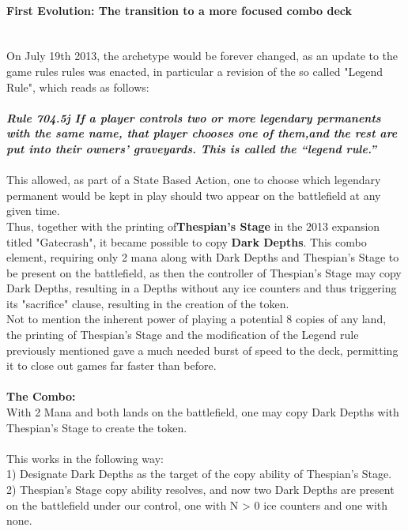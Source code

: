 \documentclass{report}
\begin{document}
\paragraph{First Evolution: The transition to a more focused combo deck\\\\}
On July 19th 2013, the archetype would be forever changed, as an update to the game rules rules was enacted, in particular a revision of the so called "Legend Rule", which reads as follows:\\\\
\textbf {\emph{Rule 704.5j If a player controls two or more legendary permanents with the same name, that player chooses one of them,and the rest are put into their owners’ graveyards. This is called the “legend rule.”\\\\}}
This allowed, as part of a State Based Action, one to choose which legendary permanent would be kept in play should two appear on the battlefield at any given time. \\Thus, together with the printing of\textbf{Thespian's Stage} in the 2013 expansion titled "Gatecrash", it became possible to copy \textbf{Dark Depths}. This combo element, requiring only 2 mana along with Dark Depths and Thespian's Stage to be present on the battlefield, as then the controller of Thespian's Stage may copy Dark Depths, resulting in a Depths without any ice counters and thus triggering its "sacrifice" clause, resulting in the creation of the token.\\
Not to mention the inherent power of playing a potential 8 copies of any land, the printing of Thespian's Stage and the modification of the Legend rule previously mentioned gave a much needed burst of speed to the deck, permitting it to close out games far faster than before.\\\\
\textbf{The Combo:}\\
With 2 Mana and both lands on the battlefield, one may copy Dark Depths with Thespian's Stage to create the token.
\\\\
This works in the following way:\\
1) Designate Dark Depths as the target of the copy ability of Thespian's Stage.\\
2) Thespian's Stage copy ability resolves, and now two Dark Depths are present on the battlefield under our control, one with N > 0 ice counters and one with none.\\
\end{document}
